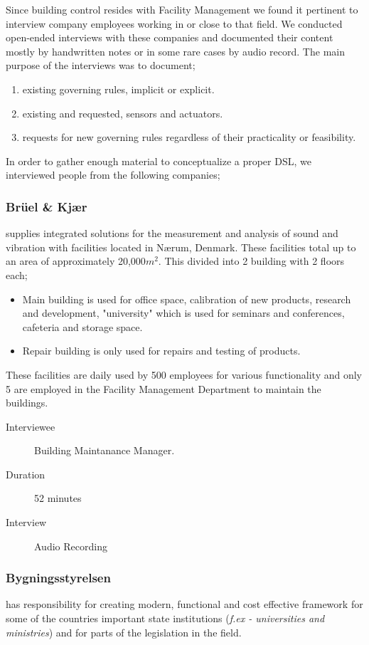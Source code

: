 Since building control resides with Facility Management we found it pertinent to interview company employees working in or close to that field. We conducted open-ended interviews with these companies and documented their content mostly by handwritten notes or in some rare cases by audio record. The main purpose of the interviews was to document;

\begin{enumerate}
	\item existing governing rules, implicit or explicit.
	\item existing and requested, sensors and actuators.
	\item requests for new governing rules regardless of their practicality or feasibility.
\end{enumerate}

In order to gather enough material to conceptualize a proper DSL, we interviewed people from the following companies;

\subsubsection{Br\"{u}el \& Kj\ae r} supplies integrated solutions for the measurement and analysis of sound and vibration with facilities located in N\ae rum, Denmark. These facilities total up to an area of approximately 20,000$m^2$. This divided into 2 building with 2 floors each; 
\begin{itemize}
	\item Main building is used for office space, calibration of new products, research and development, "university" which is used for seminars and conferences, cafeteria and storage space.
	\item Repair building is only used for repairs and testing of products.
\end{itemize}	
These facilities are daily used by 500 employees for various functionality and only 5 are employed in the Facility Management Department to maintain the buildings.
\begin{description}
	\item[Interviewee] Building Maintanance Manager.
	\item[Duration] 52 minutes
	\item[Interview] Audio Recording
\end{description}

\subsubsection{Bygningsstyrelsen} has responsibility for creating modern, functional and cost effective framework for some of the countries important state institutions (\textit{f.ex - universities and ministries}) and for parts of the legislation in the field.

